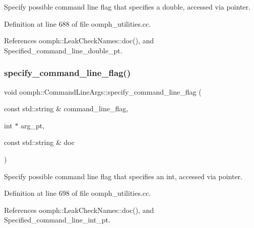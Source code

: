 Specify possible command line flag that specifies a double, accessed via pointer. 



Definition at line 688 of file oomph\+\_\+utilities.\+cc.



References oomph\+::\+Leak\+Check\+Names\+::doc(), and Specified\+\_\+command\+\_\+line\+\_\+double\+\_\+pt.

\mbox{\label{namespaceoomph_1_1CommandLineArgs_a4f5c63f51f006503cf75dd6fccaf971c}} 
\subsubsection{\texorpdfstring{specify\+\_\+command\+\_\+line\+\_\+flag()}{specify\_command\_line\_flag()}\hspace{0.1cm}{\footnotesize\ttfamily [3/5]}}
{\footnotesize\ttfamily void oomph\+::\+Command\+Line\+Args\+::specify\+\_\+command\+\_\+line\+\_\+flag (\begin{DoxyParamCaption}\item[{const std\+::string \&}]{command\+\_\+line\+\_\+flag,  }\item[{int $\ast$}]{arg\+\_\+pt,  }\item[{const std\+::string \&}]{doc }\end{DoxyParamCaption})}



Specify possible command line flag that specifies an int, accessed via pointer. 



Definition at line 698 of file oomph\+\_\+utilities.\+cc.



References oomph\+::\+Leak\+Check\+Names\+::doc(), and Specified\+\_\+command\+\_\+line\+\_\+int\+\_\+pt.

\mbox{\label{namespaceoomph_1_1CommandLineArgs_aa5aa20da06e63203c96ae8c78928d405}} 
